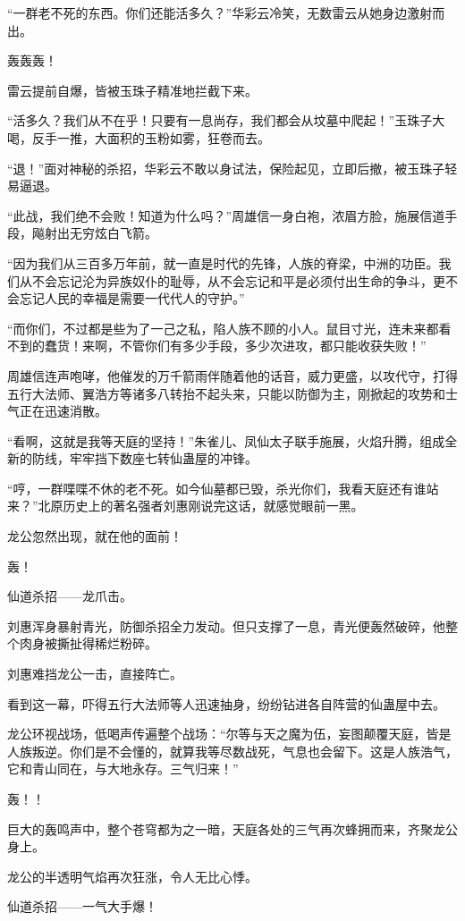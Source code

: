 \begin{this_body}
“一群老不死的东西。你们还能活多久？”华彩云冷笑，无数雷云从她身边激射而出。

轰轰轰！

雷云提前自爆，皆被玉珠子精准地拦截下来。

“活多久？我们从不在乎！只要有一息尚存，我们都会从坟墓中爬起！”玉珠子大喝，反手一推，大面积的玉粉如雾，狂卷而去。

“退！”面对神秘的杀招，华彩云不敢以身试法，保险起见，立即后撤，被玉珠子轻易逼退。

“此战，我们绝不会败！知道为什么吗？”周雄信一身白袍，浓眉方脸，施展信道手段，飚射出无穷炫白飞箭。

“因为我们从三百多万年前，就一直是时代的先锋，人族的脊梁，中洲的功臣。我们从不会忘记沦为异族奴仆的耻辱，从不会忘记和平是必须付出生命的争斗，更不会忘记人民的幸福是需要一代代人的守护。”

“而你们，不过都是些为了一己之私，陷人族不顾的小人。鼠目寸光，连未来都看不到的蠢货！来啊，不管你们有多少手段，多少次进攻，都只能收获失败！”

周雄信连声咆哮，他催发的万千箭雨伴随着他的话音，威力更盛，以攻代守，打得五行大法师、翼浩方等诸多八转抬不起头来，只能以防御为主，刚掀起的攻势和士气正在迅速消散。

“看啊，这就是我等天庭的坚持！”朱雀儿、凤仙太子联手施展，火焰升腾，组成全新的防线，牢牢挡下数座七转仙蛊屋的冲锋。

“哼，一群喋喋不休的老不死。如今仙墓都已毁，杀光你们，我看天庭还有谁站来？”北原历史上的著名强者刘惠刚说完这话，就感觉眼前一黑。

龙公忽然出现，就在他的面前！

轰！

仙道杀招——龙爪击。

刘惠浑身暴射青光，防御杀招全力发动。但只支撑了一息，青光便轰然破碎，他整个肉身被撕扯得稀烂粉碎。

刘惠难挡龙公一击，直接阵亡。

看到这一幕，吓得五行大法师等人迅速抽身，纷纷钻进各自阵营的仙蛊屋中去。

龙公环视战场，低喝声传遍整个战场：“尔等与天之魔为伍，妄图颠覆天庭，皆是人族叛逆。你们是不会懂的，就算我等尽数战死，气息也会留下。这是人族浩气，它和青山同在，与大地永存。三气归来！”

轰！！

巨大的轰鸣声中，整个苍穹都为之一暗，天庭各处的三气再次蜂拥而来，齐聚龙公身上。

龙公的半透明气焰再次狂涨，令人无比心悸。

仙道杀招——一气大手爆！


\end{this_body}
